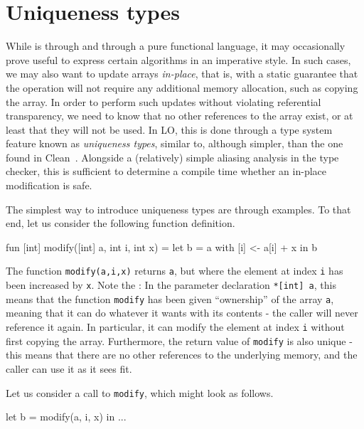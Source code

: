 \chapter{Uniqueness types}
\label{chap:uniqueness-types}

While \LO{} is through and through a pure functional language, it may
occasionally prove useful to express certain algorithms in an
imperative style.  In such cases, we may also want to update arrays
\textit{in-place}, that is, with a static guarantee that the operation
will not require any additional memory allocation, such as copying the
array.  In order to perform such updates without violating referential
transparency, we need to know that no other references to the array
exist, or at least that they will not be used.  In LO{}, this is done
through a type system feature known as \textit{uniqueness types},
similar to, although simpler, than the one found in
Clean~\cite{clean-uniqueness-types}\cite{barendsen1996uniqueness}.
Alongside a (relatively) simple aliasing analysis in the type checker,
this is sufficient to determine a compile time whether an in-place
modification is safe.

The simplest way to introduce uniqueness types are through examples.
To that end, let us consider the following function definition.

\begin{colorcode}
fun \emp{*}[int] modify(\emp{*}[int] a, int i, int x) =
  let b = a with [i] <- a[i] + x in
  b
\end{colorcode}

The function \texttt{modify(a,i,x)} returns \texttt{a}, but where the
element at index \texttt{i} has been increased by \texttt{x}.  Note
the : In the parameter declaration \texttt{*[int] a},
this means that the function \texttt{modify} has been given
``ownership'' of the array \texttt{a}, meaning that it can do whatever
it wants with its contents - the caller will never reference it again.
In particular, it can modify the element at index \texttt{i} without
first copying the array.  Furthermore, the return value of
\texttt{modify} is also unique - this means that there are no other
references to the underlying memory, and the caller can use it as it
sees fit.

Let us consider a call to \texttt{modify}, which might look as
follows.

\begin{colorcode}
let b = modify(a, i, x) in
...
\end{colorcode}

